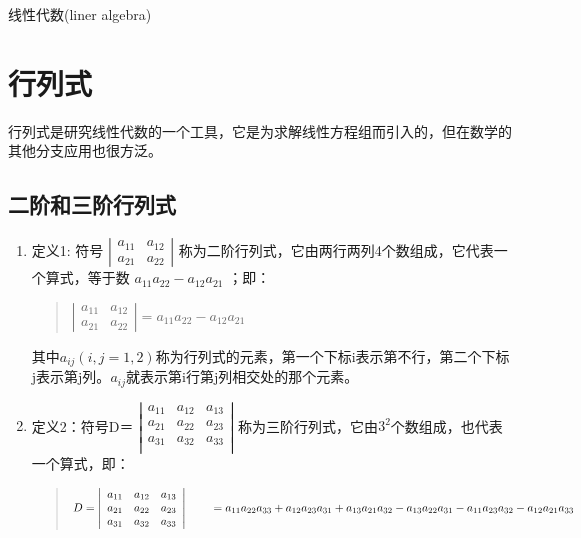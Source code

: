\documentclass[a4paper,10pt]{article}
\begin{document}
\begin{CJK}{UTF8}{song}
\begin{center}
\Large 线性代数(liner algebra)
\end{center}
\section{行列式}
行列式是研究线性代数的一个工具，它是为求解线性方程组而引入的，但在数学的其他分支应用也很方泛。
\subsection{二阶和三阶行列式}
\begin{enumerate}
\item 定义1: 符号
 $\left|\begin{array}{cc}a_{11}&a_{12} \\
                                      a_{21}&a_{22}\end{array} \right|$ 
称为二阶行列式，它由两行两列4个数组成，它代表一个算式，等于数 $a_{11}a_{22}-a_{12}a_{21}$ ；即：
\begin{quote}
$\left|\begin{array}{cc}
    a_{11}&a_{12} \\
    a_{21}&a_{22}
\end{array} \right| =a_{11}a_{22}-a_{12}a_{21} $
\end{quote}
其中$a_{ij}(i,j=1,2)$称为行列式的元素，第一个下标i表示第不行，第二个下标j表示第j列。$a_{ij}$就表示第i行第j列相交处的那个元素。
\item 定义2：符号D＝
$\left|\begin{array}{ccc}
a_{11}&a_{12}&a_{13} \\
a_{21}&a_{22}&a_{23} \\
a_{31}&a_{32}&a_{33}  \\
\end{array}\right| $
称为三阶行列式，它由$3^{2}$个数组成，也代表一个算式，即：
\begin{quote}
$D=\left|\begin{array}{ccc}
a_{11}&a_{12}&a_{13} \\
a_{21}&a_{22}&a_{23} \\
a_{31}&a_{32}&a_{33}  \\
\end{array}\right|  \\
 \quad\quad =a_{11}a_{22}a_{33}+a_{12}a_{23}a_{31}+a_{13}a_{21}a_{32}-a_{13}a_{22}a_{31}-a_{11}a_{23}a_{32}-a_{12}a_{21}a_{33}
$
\end{quote}
\end{enumerate}

\end{CJK}
\end{document}
